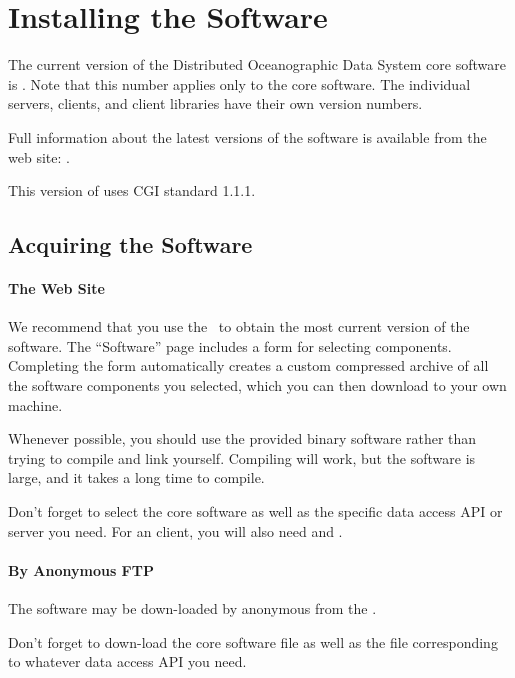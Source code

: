 %
%

\chapter{Installing the \opendap Software}
\label{install}

The current version of the Distributed Oceanographic Data System core
software is \OPDversion .  Note that this number applies only to the
core software.  The individual servers, clients, and client libraries
have their own version numbers.

Full information about the latest versions of the \opendap software is
available from the \opendap web site: \OPDhome .

This version of \opendap uses CGI standard 1.1.1.

\section{Acquiring the \opendap Software}



\subsubsection{The \opendap Web Site}

We recommend that you use the \OPDhome\ to obtain the most current
version of the software.  The ``Software'' page includes a form for
selecting \opendap components.  Completing the form automatically creates
a custom compressed archive of all the software components you
selected, which you can then download to your own machine.

Whenever possible, you should use the provided binary software rather
than trying to compile and link \opendap yourself.  Compiling will work,
but the \opendap software is large, and it takes a long time to compile.

Don't forget to select the core software as well as the specific data
access API or server you need.  For an \opendap client, you will also need
 and .


\subsubsection{By Anonymous FTP}

The \opendap software may be down-loaded by anonymous  from
the \OPDftp .

Don't forget to down-load the core software  file as well as
the  file corresponding to whatever data access API you need.

